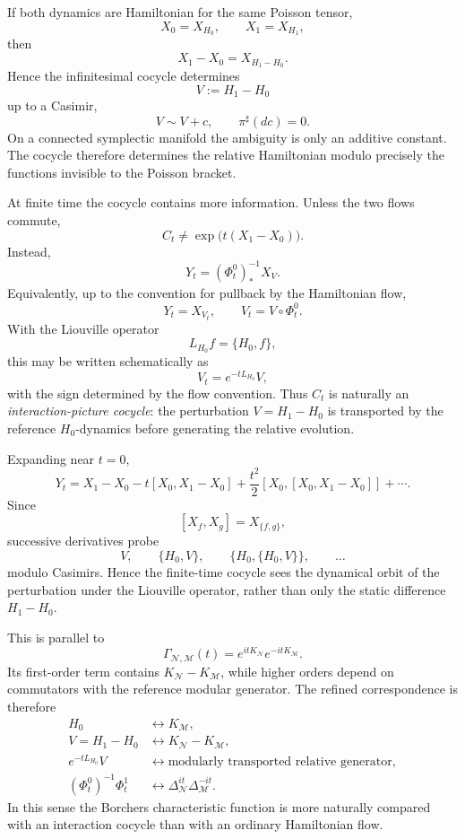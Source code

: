 \documentclass[11pt]{article}
\newcommand{\M}{\mathcal M}
\newcommand{\N}{\mathcal N}
\begin{document}
If both dynamics are Hamiltonian for the same Poisson tensor,
\[
X_0=X_{H_0},\qquad X_1=X_{H_1},
\]
then
\[
X_1-X_0=X_{H_1-H_0}.
\]
Hence the infinitesimal cocycle determines
\[
V:=H_1-H_0
\]
up to a Casimir,
\[
V\sim V+c,\qquad \pi^\sharp(dc)=0.
\]
On a connected symplectic manifold the ambiguity is only an additive constant.
The cocycle therefore determines the relative Hamiltonian modulo precisely the
functions invisible to the Poisson bracket.

At finite time the cocycle contains more information.  Unless the two flows
commute,
\[
C_t\neq\exp\bigl(t(X_1-X_0)\bigr).
\]
Instead,
\[
Y_t=(\Phi_t^0)^{-1}_*X_V.
\]
Equivalently, up to the convention for pullback by the Hamiltonian flow,
\[
Y_t=X_{V_t},
\qquad
V_t=V\circ\Phi_t^0.
\]
With the Liouville operator
\[
L_{H_0}f=\{H_0,f\},
\]
this may be written schematically as
\[
V_t=e^{-tL_{H_0}}V,
\]
with the sign determined by the flow convention.  Thus $C_t$ is naturally an
\emph{interaction-picture cocycle}: the perturbation $V=H_1-H_0$ is transported
by the reference $H_0$-dynamics before generating the relative evolution.

Expanding near $t=0$,
\[
Y_t
=
X_1-X_0
-t[X_0,X_1-X_0]
+\frac{t^2}{2}[X_0,[X_0,X_1-X_0]]
+\cdots.
\]
Since
\[
[X_f,X_g]=X_{\{f,g\}},
\]
successive derivatives probe
\[
V,\qquad
\{H_0,V\},\qquad
\{H_0,\{H_0,V\}\},\qquad\ldots
\]
modulo Casimirs.  Hence the finite-time cocycle sees the dynamical orbit of the
perturbation under the Liouville operator, rather than only the static
difference $H_1-H_0$.

This is parallel to
\[
\Gamma_{\N,\M}(t)
=e^{itK_\N}e^{-itK_\M}.
\]
Its first-order term contains $K_\N-K_\M$, while higher orders depend on
commutators with the reference modular generator.  The refined correspondence
is therefore
\[
\begin{aligned}
H_0&\longleftrightarrow K_\M,\\
V=H_1-H_0&\longleftrightarrow K_\N-K_\M,\\
e^{-tL_{H_0}}V
&\longleftrightarrow
\text{modularly transported relative generator},\\
(\Phi_t^0)^{-1}\Phi_t^1
&\longleftrightarrow
\Delta_\N^{it}\Delta_\M^{-it}.
\end{aligned}
\]
In this sense the Borchers characteristic function is more naturally compared
with an interaction cocycle than with an ordinary Hamiltonian flow.
\end{document}
